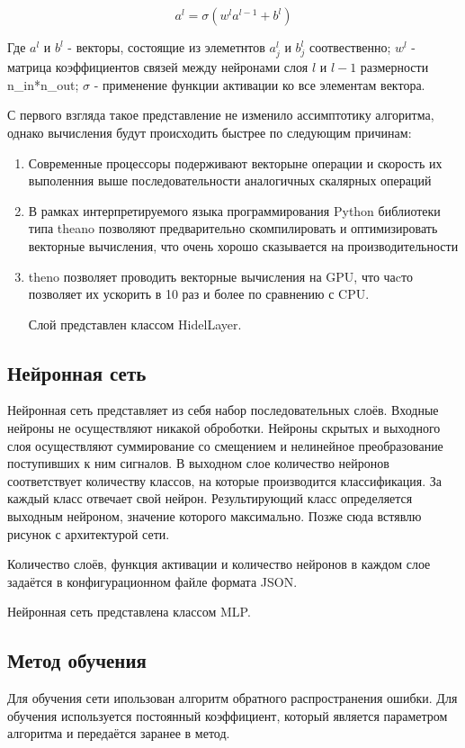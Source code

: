 \documentclass[a4paper,12pt]{article}
\begin{document}
{\large $$a^{l} = \sigma\left( w^{l} a^{l-1} + b^l \right)$$}

Где $a^{l}$ и $b^{l}$ - векторы, состоящие из элеметнтов $a^{l}_j$ и $b^l_j$ соотвественно; $w^l$ - матрица коэффициентов связей между нейронами слоя $l$ и $l-1$ размерности n\_in*n\_out; $\sigma$ - применение функции активации ко все элементам вектора.

С первого взгляда такое представление не изменило ассимптотику алгоритма, однако вычисления будут происходить быстрее по следующим причинам:
\begin{enumerate}
\item Современные процессоры подерживают векторыне операции и скорость их выполенния выше последовательности аналогичных скалярных операций
\item В рамках интерпретируемого языка программирования Python библиотеки типа theano позволяют предварительно скомпилировать и оптимизировать векторные вычисления, что очень хорошо сказывается на производительности
\item theno позволяет проводить векторные вычисления на GPU, что чаcто позволяет их ускорить в 10 раз и более по сравнению с CPU.

Слой представлен классом HidelLayer.
\end{enumerate}

\subsection{Нейронная сеть}
Нейронная сеть представляет из себя набор последовательных слоёв. Входные нейроны не осуществляют никакой оброботки. Нейроны скрытых и выходного слоя осуществляют суммирование со смещением и нелинейное преобразование поступивших к ним сигналов. В выходном слое количество нейронов соответствует количеству классов, на которые производится классификация. За каждый класс отвечает свой нейрон. Результирующий класс определяется выходным нейроном, значение которого максимально.
Позже сюда встявлю рисунок с архитектурой сети.

Количество слоёв, функция активации и количество нейронов в каждом слое задаётся в конфигурационном файле формата JSON.

Нейронная сеть представлена классом MLP.
\subsection{Метод обучения}
Для обучения сети ипользован алгоритм обратного распространения ошибки.
Для обучения используется постоянный коэффициент, который является параметром алгоритма и передаётся заранее в метод.
\end{document}

